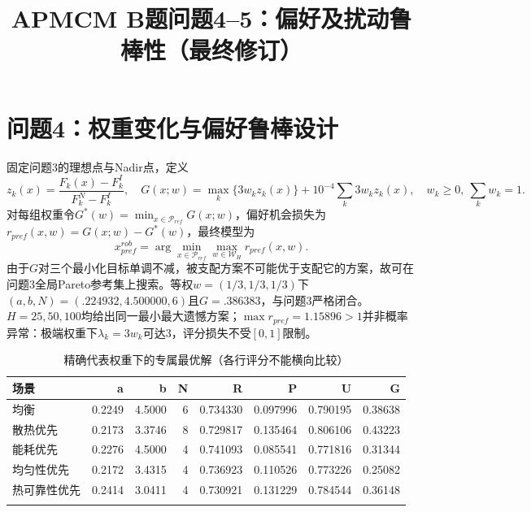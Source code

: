\documentclass[UTF8,a4paper,10pt]{ctexart}
\title{APMCM B题问题4--5：偏好及扰动鲁棒性（最终修订）}\author{}\date{}
\begin{document}
\maketitle
\section*{问题4：权重变化与偏好鲁棒设计}
固定问题3的理想点与Nadir点，定义
\[z_k(x)=\frac{F_k(x)-F_k^I}{F_k^N-F_k^I},\quad
G(x;w)=\max_k\{3w_kz_k(x)\}+10^{-4}\sum_k3w_kz_k(x),\quad
w_k\ge0,\ \sum_kw_k=1.\]
对每组权重令$G^*(w)=\min_{x\in\mathcal P_{ref}}G(x;w)$，偏好机会损失为$r_{pref}(x,w)=G(x;w)-G^*(w)$，最终模型为
\[x_{pref}^{rob}=\arg\min_{x\in\mathcal P_{ref}}\max_{w\in\mathcal W_H}r_{pref}(x,w).\]
由于$G$对三个最小化目标单调不减，被支配方案不可能优于支配它的方案，故可在问题3全局Pareto参考集上搜索。等权$w=(1/3,1/3,1/3)$下$(a,b,N)=(.224932,4.500000,6)$且$G=.386383$，与问题3严格闭合。$H=25,50,100$均给出同一最小最大遗憾方案；$\max r_{pref}=1.15896>1$并非概率异常：极端权重下$\lambda_k=3w_k$可达3，评分损失不受$[0,1]$限制。
\begin{table}[H]\centering\scriptsize\caption{精确代表权重下的专属最优解（各行评分不能横向比较）}\begin{tabular}{lrrrrrrr}\toprule 场景&a&b&N&R&P&U&G\\\midrule
均衡 & 0.2249 & 4.5000 & 6 & 0.734330 & 0.097996 & 0.790195 & 0.38638 \\
散热优先 & 0.2173 & 3.3746 & 8 & 0.729817 & 0.135464 & 0.806106 & 0.43223 \\
能耗优先 & 0.2276 & 4.5000 & 4 & 0.741093 & 0.085541 & 0.771816 & 0.31344 \\
均匀性优先 & 0.2172 & 3.4315 & 4 & 0.736923 & 0.110526 & 0.773226 & 0.25082 \\
热可靠性优先 & 0.2414 & 3.0411 & 4 & 0.730921 & 0.131229 & 0.784544 & 0.36148 \\\\\bottomrule\end{tabular}\end{table}
\end{document}
